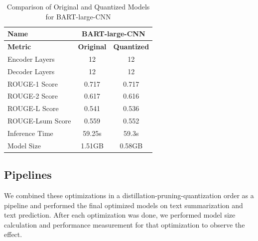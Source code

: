 \documentclass{article}
\begin{document}
    \begin{table}[h!]
        \centering
        \begin{tabular}{lcc}
            \toprule
            \textbf{Name}         & \multicolumn{2}{c}{\textbf{BART-large-CNN}} \\ \midrule
            \textbf{Metric}       & \textbf{Original} & \textbf{Quantized} \\ \midrule
            Encoder Layers        & 12                     & 12                     \\
            Decoder Layers        & 12                     & 12                     \\
            ROUGE-1 Score         & 0.717                  & 0.717                  \\
            ROUGE-2 Score         & 0.617                  & 0.616                  \\
            ROUGE-L Score         & 0.541                  & 0.536                  \\
            ROUGE-Lsum Score      & 0.559                  & 0.552                  \\
            Inference Time        & 59.25s                 & 59.3s                  \\
            Model Size            & 1.51GB                 & 0.58GB                 \\ \bottomrule
        \end{tabular}
        \caption{Comparison of Original and Quantized Models for BART-large-CNN}
        \label{tab:BART_comparison_q}
    \end{table}

    \subsection{Pipelines}
    \hspace*{1em} We combined these optimizations in a distillation-pruning-quantization order as a pipeline and performed the final optimized models on text summarization and text prediction. After each optimization was done, we performed model size calculation and performance measurement for that optimization to observe the effect.
\end{document}
